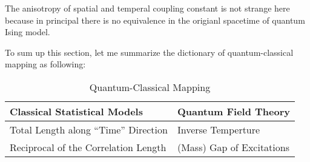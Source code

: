 \documentclass[10pt,nofootinbib]{revtex4}
\numberwithin{equation}{section}
\begin{document}
		The anisotropy of spatial and temperal coupling constant is not strange here because in principal there is no equivalence in the origianl spacetime of quantum Ising model.\par
		To sum up this section, let me summarize the dictionary of quantum-classical mapping as following:
		\begin{table}[htp]
			\begin{tabular}{p{8cm}p{6cm}}
				Classical Statistical Models & Quantum Field Theory\\ 
				\hline\hline
				Total Length along ``Time'' Direction & Inverse Temperture \\ 
				Reciprocal of the Correlation Length & (Mass) Gap of Excitations \\ 
			\end{tabular}
			\caption{Quantum-Classical Mapping}
			\label{tab:1}
		\end{table}
\end{document}
